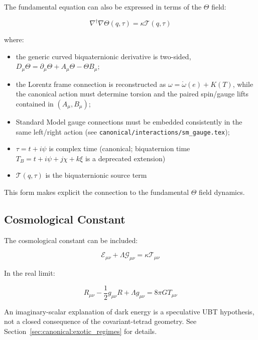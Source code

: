 \documentclass[12pt,a4paper]{article}
\begin{document}
The fundamental equation can also be expressed in terms of the $\Theta$ field:

\begin{equation}
\nabla^\dagger \nabla \Theta(q,\tau) = \kappa \mathcal{T}(q,\tau)
\end{equation}

where:

\begin{itemize}
    \item the generic curved biquaternionic derivative is two-sided,
    $D_\mu\Theta=\partial_\mu\Theta+A_\mu\Theta-\Theta B_\mu$;
    \item the Lorentz frame connection is reconstructed as
    $\omega=\mathring\omega(e)+K(T)$, while the canonical action must determine
    torsion and the paired spin/gauge lifts contained in $(A_\mu,B_\mu)$;
    \item Standard Model gauge connections must be embedded consistently in
    the same left/right action (see \texttt{canonical/interactions/sm\_gauge.tex});
    \item $\tau = t + i\psi$ is complex time (canonical; biquaternion time $T_B = t + i\psi + j\chi + k\xi$ is a deprecated extension)
    \item $\mathcal{T}(q,\tau)$ is the biquaternionic source term
\end{itemize}

This form makes explicit the connection to the fundamental $\Theta$ field dynamics.

\subsection{Cosmological Constant}

The cosmological constant can be included:

\begin{equation}
\mathcal{E}_{\mu\nu} + \Lambda \mathcal{G}_{\mu\nu}
= \kappa \mathcal{T}_{\mu\nu}
\end{equation}

In the real limit:

\begin{equation}
R_{\mu\nu} - \frac{1}{2} g_{\mu\nu} R + \Lambda g_{\mu\nu} = 8\pi G T_{\mu\nu}
\end{equation}

An imaginary-scalar explanation of dark energy is a speculative UBT hypothesis, not a closed consequence of the covariant-tetrad geometry. See Section~\ref{sec:canonical:exotic_regimes} for details.
\end{document}
